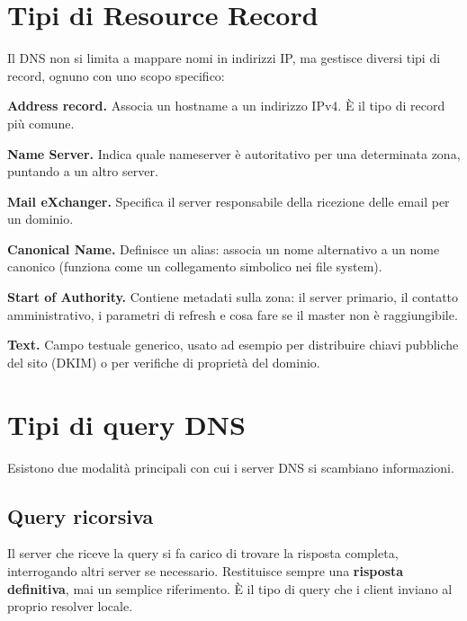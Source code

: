 \documentclass{article}
\begin{document}
\section*{Tipi di Resource Record}

Il DNS non si limita a mappare nomi in indirizzi IP, ma gestisce diversi
tipi di record, ognuno con uno scopo specifico:

\begin{description}[leftmargin=2cm, style=nextline]
    \item[\texttt{A}] \textbf{Address record.} Associa un hostname a un
        indirizzo IPv4. È il tipo di record più comune.
    \item[\texttt{NS}] \textbf{Name Server.} Indica quale nameserver è
        autoritativo per una determinata zona, puntando a un altro server.
    \item[\texttt{MX}] \textbf{Mail eXchanger.} Specifica il server
        responsabile della ricezione delle email per un dominio.
    \item[\texttt{CNAME}] \textbf{Canonical Name.} Definisce un alias: associa
        un nome alternativo a un nome canonico (funziona come un collegamento
        simbolico nei file system).
    \item[\texttt{SOA}] \textbf{Start of Authority.} Contiene metadati sulla
        zona: il server primario, il contatto amministrativo, i parametri di
        refresh e cosa fare se il master non è raggiungibile.
    \item[\texttt{TXT}] \textbf{Text.} Campo testuale generico, usato ad
        esempio per distribuire chiavi pubbliche del sito (DKIM) o per
        verifiche di proprietà del dominio.
\end{description}


\section*{Tipi di query DNS}

Esistono due modalità principali con cui i server DNS si scambiano
informazioni.

\subsection*{Query ricorsiva}

Il server che riceve la query si fa carico di trovare la risposta completa,
interrogando altri server se necessario. Restituisce sempre una \textbf{risposta
definitiva}, mai un semplice riferimento. È il tipo di query che i client
inviano al proprio resolver locale.
\end{document}
